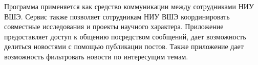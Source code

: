 Программа применяется как средство коммуникации между сотрудниками НИУ ВШЭ. Сервис также позволяет сотрудникам НИУ ВШЭ координировать совместные исследования и проекты научного характера. Приложение предоставляет доступ к общению посредством сообщений, дает возможность делиться новостями с помощью публикации постов. Также приложение дает возможность фильтровать новости по интересущим темам. 
